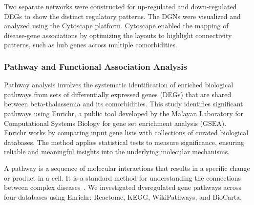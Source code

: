 Two separate networks were constructed for up-regulated and down-regulated DEGs to show the distinct regulatory patterns. The DGNs were visualized and analyzed using the Cytoscape platform. Cytoscape enabled the mapping of disease-gene associations by optimizing the layouts to highlight connectivity patterns, such as hub genes across multiple comorbidities.

\vspace*{-\parskip} %
\subsubsection{Pathway and Functional Association Analysis}
\label{sec:sec:sec3_4_4}

Pathway analysis involves the systematic identification of enriched biological pathways from sets of differentially expressed genes (DEGs) that are shared between beta-thalassemia and its comorbidities. This study identifies significant pathways using Enrichr, a public tool developed by the Ma'ayan Laboratory for Computational Systems Biology for gene set enrichment analysis (GSEA). Enrichr works by comparing input gene lists with collections of curated biological databases. The method applies statistical tests to measure significance, ensuring reliable and meaningful insights into the underlying molecular mechanisms.

A pathway is a sequence of molecular interactions that results in a specific change or product in a cell. It is a standard method for understanding the connections between complex diseases~\cite{pathway_ref}. We investigated dysregulated gene pathways across four databases using Enrichr: Reactome, KEGG, WikiPathways, and BioCarta.

